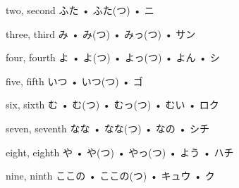 



\setcounter{cardnum}{1}

		{two, second}
		{ふた • ふた(つ) • ニ}
		{}{}
		{}{}
		{}{}
		{}{}
		{}{}

		{three, third}
		{み • み(つ) • みっ(つ) • サン}
		{}{}
		{}{}
		{}{}
		{}{}
		{}{}

		{four, fourth}
		{よ • よ(つ)  • よっ(つ)  • よん  • シ}
		{}{}
		{}{}
		{}{}
		{}{}
		{}{}

		{five, fifth}
		{いつ • いつ(つ) • ゴ}
		{}{}
		{}{}
		{}{}
		{}{}
		{}{}

		{six, sixth}
		{む • む(つ) • むっ(つ) • むい • ロク}
		{}{}
		{}{}
		{}{}
		{}{}
		{}{}

		{seven, seventh}
		{なな • なな(つ) • なの • シチ}
		{}{}
		{}{}
		{}{}
		{}{}
		{}{}

		{eight, eighth}
		{や • や(つ) • やっ(つ) • よう • ハチ}
		{}{}
		{}{}
		{}{}
		{}{}
		{}{}

		{nine, ninth}
		{ここの • ここの(つ) • キュウ • ク}
		{}{}
		{}{}
		{}{}
		{}{}
		{}{}

